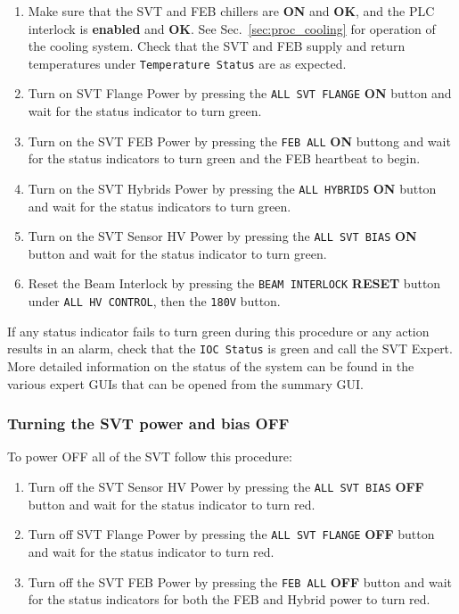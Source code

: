 \documentclass[12pt]{report}
\begin{document}
\begin{enumerate}
\item Make sure that the SVT and FEB chillers are \textbf{ON} and \textbf{OK}, and the PLC interlock is \textbf{enabled} and \textbf{OK}. See Sec.~\ref{sec:proc_cooling} for operation of the cooling system.  Check that the SVT and FEB supply and return temperatures under \texttt{Temperature Status} are as expected.
\item Turn on SVT Flange Power by pressing the \texttt{ALL SVT FLANGE} \textbf{ON} button and wait for the status indicator to turn green.
\item Turn on the SVT FEB Power by pressing the \texttt{FEB ALL} \textbf{ON} buttong and wait for the status indicators to turn green and the FEB heartbeat to begin.
\item Turn on the SVT Hybrids Power by pressing the \texttt{ALL HYBRIDS} \textbf{ON} button and wait for the status indicators to turn green.
\item Turn on the SVT Sensor HV Power by pressing the \texttt{ALL SVT BIAS} \textbf{ON} button and wait for the status indicator to turn green.
\item Reset the Beam Interlock by pressing the \texttt{BEAM INTERLOCK} \textbf{RESET} button under \texttt{ALL HV CONTROL}, then the \texttt{180V} button.
\end{enumerate}

If any status indicator fails to turn green during this procedure or any action results in an alarm, check that the \texttt{IOC Status} is green and call the SVT Expert.  More detailed information on the status of the system can be found in the various expert GUIs that can be opened from the summary GUI.

\subsubsection{Turning the SVT power and bias OFF}
\label{sec:proc_voltages_alloff}
To power OFF all of the SVT follow this procedure:
\begin{enumerate}
\item Turn off the SVT Sensor HV Power by pressing the \texttt{ALL SVT BIAS} \textbf{OFF} button and wait for the status indicator to turn red.
\item Turn off SVT Flange Power by pressing the \texttt{ALL SVT FLANGE} \textbf{OFF} button and wait for the status indicator to turn red.
\item Turn off the SVT FEB Power by pressing the \texttt{FEB ALL} \textbf{OFF} button and wait for the status indicators for both the FEB and Hybrid power to turn red.
\end{enumerate}
\end{document}
